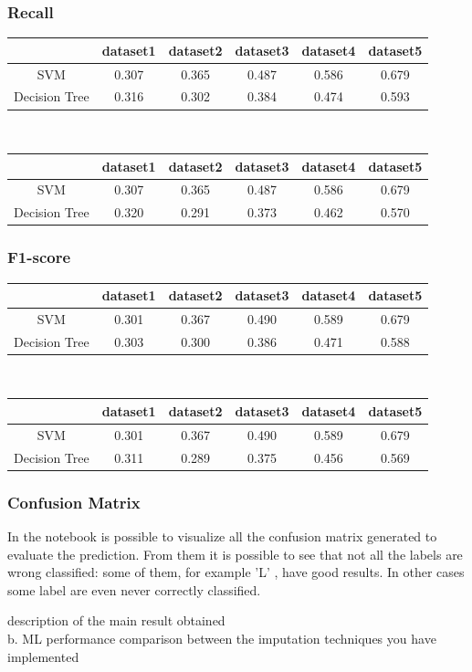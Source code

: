 \documentclass{article}
\begin{document}
\subsubsection*{Recall}
\begin{table}[H]
\begin{tabular}{|c|c|c|c|c|c|}
\hline
 & dataset1 & dataset2 & dataset3 & dataset4 & dataset5 \\ \hline
SVM & 0.307 & 0.365 & 0.487 & 0.586 & 0.679 \\ \hline
Decision Tree & 0.316 & 0.302 & 0.384 & 0.474 & 0.593 \\ \hline
\end{tabular}\\
\begin{tabular}{|c|c|c|c|c|c|}
\hline
 & dataset1 & dataset2 & dataset3 & dataset4 & dataset5 \\ \hline
SVM & 0.307 & 0.365 & 0.487 & 0.586 & 0.679 \\ \hline
Decision Tree & 0.320 & 0.291 & 0.373 & 0.462 & 0.570 \\ \hline
\end{tabular}
\end{table}
\subsubsection*{F1-score}
\begin{table}[h]
\begin{tabular}{|c|c|c|c|c|c|}
\hline
 & dataset1 & dataset2 & dataset3 & dataset4 & dataset5 \\ \hline
SVM & 0.301 & 0.367 & 0.490 & 0.589 & 0.679 \\ \hline
Decision Tree & 0.303 & 0.300 & 0.386 & 0.471 & 0.588 \\ \hline
\end{tabular}\\
\begin{tabular}{|c|c|c|c|c|c|}
\hline
 & dataset1 & dataset2 & dataset3 & dataset4 & dataset5 \\ \hline
SVM & 0.301 & 0.367 & 0.490 & 0.589 & 0.679 \\ \hline
Decision Tree & 0.311 & 0.289 & 0.375 & 0.456 & 0.569 \\ \hline
\end{tabular}
\end{table}
\subsubsection*{Confusion Matrix}
In the notebook is possible to visualize all the confusion matrix generated to evaluate the prediction. From them it is possible to see that not all the labels are wrong classified: some of them, for example 'L' , have good results. In other cases some label are even never correctly classified. 








description of the main result obtained\\
b.	ML performance comparison between the imputation techniques you have implemented
\end{document}
